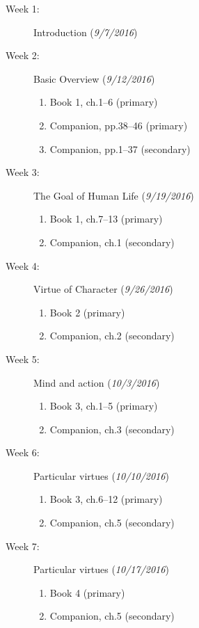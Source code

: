 \documentclass[article,oneside]{memoir}
\begin{document}
\begin{description}

\item[Week 1:] Introduction  (\emph{9/7/2016})

\item[Week 2:]  Basic Overview  (\emph{9/12/2016})
\begin{enumerate}
\item Book 1, ch.1--6 (primary)
\item Companion, pp.38--46 (primary)
\item Companion, pp.1--37 (secondary)
\end{enumerate}

\item[Week 3:] The Goal of Human Life (\emph{9/19/2016})
\begin{enumerate}
\item Book 1, ch.7--13 (primary)
\item Companion, ch.1 (secondary)
\end{enumerate}

\item[Week 4: ] Virtue of Character (\emph{9/26/2016})
\begin{enumerate}
\item Book 2 (primary)
\item Companion, ch.2 (secondary)
\end{enumerate}


\item[Week 5: ] Mind and action (\emph{10/3/2016})
\begin{enumerate}
\item Book 3, ch.1--5 (primary)
\item Companion, ch.3 (secondary)
 \end{enumerate}
 
\item[Week 6:] Particular virtues (\emph{10/10/2016})
\begin{enumerate}
\item Book 3, ch.6--12  (primary)
\item Companion, ch.5 (secondary)
\end{enumerate}

\item[Week 7:] Particular virtues (\emph{10/17/2016})
\begin{enumerate}
\item Book 4 (primary)
\item Companion, ch.5 (secondary)
\end{enumerate}



\end{description}
\end{document}
